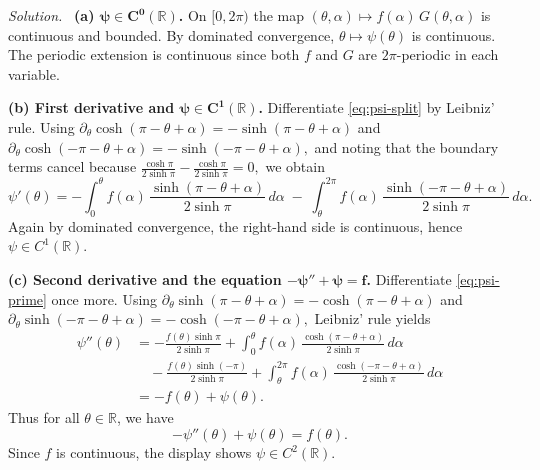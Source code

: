 \documentclass[11pt,a4paper]{article}
\newenvironment{solution}{\par\noindent\textit{Solution.}\ }{\par\vspace{0.5em}}
\begin{document}
\begin{solution}
	\textbf{(a) $\boldsymbol{\psi\in C^0(\mathbb{R})}$.}
	On $[0,2\pi)$ the map $(\theta,\alpha)\mapsto f(\alpha)\,G(\theta,\alpha)$ is continuous and bounded.
	By dominated convergence, $\theta\mapsto\psi(\theta)$ is continuous. The periodic extension is continuous
	since both $f$ and $G$ are $2\pi$-periodic in each variable.
	
	\medskip
	\textbf{(b) First derivative and $\boldsymbol{\psi\in C^1(\mathbb{R})}$.}
	Differentiate \eqref{eq:psi-split} by Leibniz' rule. Using
	\(
	\partial_\theta\cosh(\pi-\theta+\alpha)=-\sinh(\pi-\theta+\alpha)
	\)
	and
	\(
	\partial_\theta\cosh(-\pi-\theta+\alpha)=-\sinh(-\pi-\theta+\alpha),
	\)
	and noting that the boundary terms cancel because
	$
	\frac{\cosh\pi}{2\sinh\pi}-\frac{\cosh\pi}{2\sinh\pi}=0,
	$
	we obtain
	\begin{equation}\label{eq:psi-prime}
		\psi'(\theta)= -\int_0^\theta f(\alpha)\,\frac{\sinh(\pi-\theta+\alpha)}{2\sinh\pi}\,d\alpha
		\;-\; \int_\theta^{2\pi} f(\alpha)\,\frac{\sinh(-\pi-\theta+\alpha)}{2\sinh\pi}\,d\alpha.
	\end{equation}
	Again by dominated convergence, the right-hand side is continuous, hence $\psi\in C^1(\mathbb{R})$.
	
	\medskip
	\textbf{(c) Second derivative and the equation $\boldsymbol{-\psi''+\psi=f}$.}
	Differentiate \eqref{eq:psi-prime} once more. Using
	\(
	\partial_\theta\sinh(\pi-\theta+\alpha)=-\cosh(\pi-\theta+\alpha)
	\)
	and
	\(
	\partial_\theta\sinh(-\pi-\theta+\alpha)=-\cosh(-\pi-\theta+\alpha),
	\)
	Leibniz' rule yields
	\begin{align*}
		\psi''(\theta)
		&=-\frac{f(\theta)\sinh\pi}{2\sinh\pi}+\int_{0}^{\theta} f(\alpha)\,\frac{\cosh(\pi-\theta+\alpha)}{2\sinh\pi}\,d\alpha \\
		&\quad-\frac{f(\theta)\sinh(-\pi)}{2\sinh\pi}+\int_{\theta}^{2\pi} f(\alpha)\,\frac{\cosh(-\pi-\theta+\alpha)}{2\sinh\pi}\,d\alpha \\
		&=-f(\theta)+\psi(\theta).
	\end{align*}
	Thus for all $\theta\in\mathbb{R}$, we have
	\begin{equation*}
		-\psi''(\theta)+\psi(\theta)=f(\theta).
	\end{equation*}
	Since $f$ is continuous, the display shows $\psi\in C^2(\mathbb{R})$.
\end{solution}



	
\end{document}
